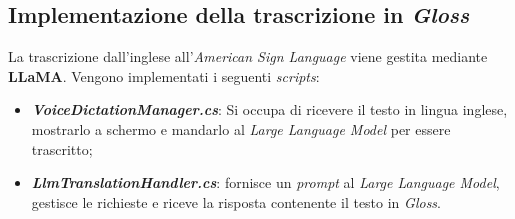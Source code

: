 \documentclass[12pt, a4paper]{article}
\begin{document}
    \subsection{Implementazione della trascrizione in \textit{Gloss}}
    La trascrizione dall'inglese all'\textit{American Sign Language} viene gestita mediante 
    \textbf{LLaMA}.
    Vengono implementati i seguenti \textit{scripts}:
    \begin{itemize}
        \item \textit{\textbf{VoiceDictationManager.cs}}: Si occupa di ricevere il testo 
        in lingua inglese, mostrarlo a schermo e mandarlo al \textit{Large Language Model} 
        per essere trascritto;
        \item \textit{\textbf{LlmTranslationHandler.cs}}: fornisce un \textit{prompt} al 
        \textit{Large Language Model}, gestisce le richieste e riceve la risposta contenente 
        il testo in \textit{Gloss}.
    \end{itemize}
\end{document}
